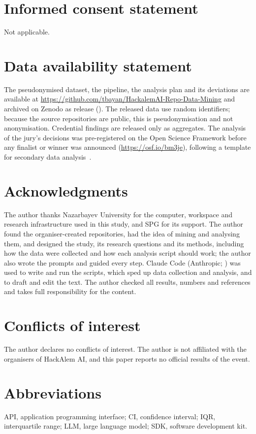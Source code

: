 \documentclass{article}
\begin{document}
\section*{Informed consent statement}
Not applicable.

\section*{Data availability statement}
The pseudonymised dataset, the pipeline, the analysis plan and its deviations are available at \url{https://github.com/tbayan/HackalemAI-Repo-Data-Mining} and archived on Zenodo as release \zenodoversion{} (\zenodorelease). The released data use random identifiers; because the source repositories are public, this is pseudonymisation and not anonymisation. Credential findings are released only as aggregates. The analysis of the jury's decisions was pre-registered on the Open Science Framework before any finalist or winner was announced (\url{https://osf.io/bm3je}), following a template for secondary data analysis~\cite{vandenakker2021prereg}.

\section*{Acknowledgments}
The author thanks Nazarbayev University for the computer, workspace and research infrastructure used in this study, and SPG for its support. The author found the organiser-created repositories, had the idea of mining and analysing them, and designed the study, its research questions and its methods, including how the data were collected and how each analysis script should work; the author also wrote the prompts and guided every step. Claude Code (Anthropic; \aimodel) was used to write and run the scripts, which sped up data collection and analysis, and to draft and edit the text. The author checked all results, numbers and references and takes full responsibility for the content.

\section*{Conflicts of interest}
The author declares no conflicts of interest. The author is not affiliated with the organisers of HackAlem AI, and this paper reports no official results of the event.

\section*{Abbreviations}
API, application programming interface; CI, confidence interval; IQR, interquartile range; LLM, large language model; SDK, software development kit.



\end{document}
